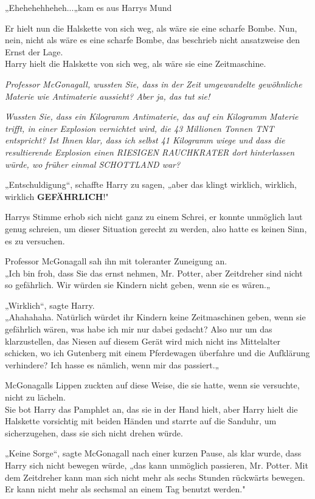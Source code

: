 {„Ehehehehheheh...„kam es aus Harrys Mund

Er hielt nun die Halskette von sich weg, als wäre sie eine scharfe Bombe. Nun, nein, nicht als wäre es eine scharfe Bombe, das beschrieb nicht ansatzweise den Ernst der Lage.\\ Harry hielt die Halskette von sich weg, als wäre sie eine Zeitmaschine.

\emph{Professor McGonagall, wussten Sie, dass in der Zeit umgewandelte gewöhnliche Materie wie Antimaterie aussieht? Aber ja, das tut sie!}

\emph{Wussten Sie, dass ein Kilogramm Antimaterie, das auf ein Kilogramm Materie trifft, in einer Explosion vernichtet wird, die 43 Millionen Tonnen TNT entspricht? Ist Ihnen klar, dass ich selbst 41 Kilogramm wiege und dass die resultierende Explosion einen RIESIGEN RAUCHKRATER dort hinterlassen würde, wo früher einmal SCHOTTLAND war?}

„Entschuldigung“, schaffte Harry zu sagen, „aber das klingt wirklich, wirklich, wirklich \textbf{GEFÄHRLICH}!"

Harrys Stimme erhob sich nicht ganz zu einem Schrei, er konnte unmöglich laut genug schreien, um dieser Situation gerecht zu werden, also hatte es keinen Sinn, es zu versuchen.

Professor McGonagall sah ihn mit toleranter Zuneigung an.\\ „Ich bin froh, dass Sie das ernst nehmen, Mr. Potter, aber Zeitdreher sind nicht so gefährlich. Wir würden sie Kindern nicht geben, wenn sie es wären.„

„Wirklich“, sagte Harry.\\ „Ahahahaha. Natürlich würdet ihr Kindern keine Zeitmaschinen geben, wenn sie gefährlich wären, was habe ich mir nur dabei gedacht? Also nur um das klarzustellen, das Niesen auf diesem Gerät wird mich nicht ins Mittelalter schicken, wo ich Gutenberg mit einem Pferdewagen überfahre und die Aufklärung verhindere? Ich hasse es nämlich, wenn mir das passiert.„

McGonagalls Lippen zuckten auf diese Weise, die sie hatte, wenn sie versuchte, nicht zu lächeln.\\ Sie bot Harry das Pamphlet an, das sie in der Hand hielt, aber Harry hielt die Halskette vorsichtig mit beiden Händen und starrte auf die Sanduhr, um sicherzugehen, dass sie sich nicht drehen würde.

„Keine Sorge“, sagte McGonagall nach einer kurzen Pause, als klar wurde, dass Harry sich nicht bewegen würde, „das kann unmöglich passieren, Mr. Potter. Mit dem Zeitdreher kann man sich nicht mehr als sechs Stunden rückwärts bewegen. Er kann nicht mehr als sechsmal an einem Tag benutzt werden."

}
